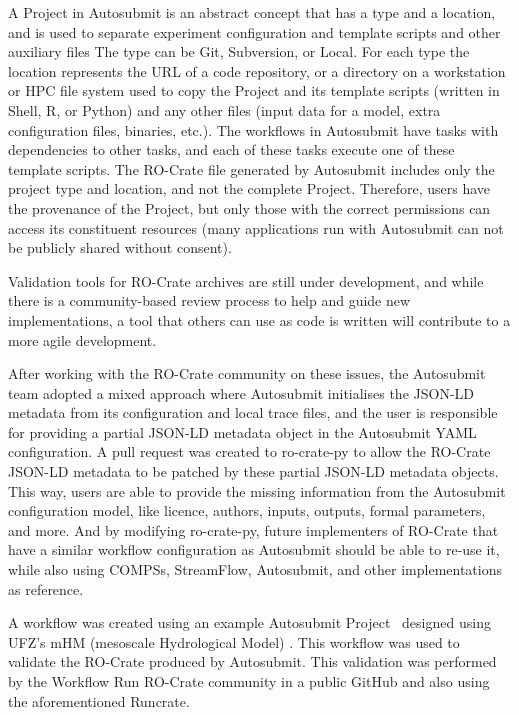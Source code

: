 A Project in Autosubmit is an abstract concept that has a type and a location, and is used to separate experiment configuration and template scripts and other auxiliary files
The type can be Git, Subversion, or Local.
For each type the location represents the URL of a code repository, or a directory on a workstation or HPC file system used to copy the Project and its template scripts (written in Shell, R, or Python) and any other files (input data for a model, extra configuration files, binaries, etc.).
The workflows in Autosubmit have tasks with dependencies to other tasks, and each of these tasks execute one of these template scripts.
The RO-Crate file generated by Autosubmit includes only the project type and location, and not the complete Project.
Therefore, users have the provenance of the Project, but only those with the correct permissions can access its constituent resources (many applications run with Autosubmit can not be publicly shared without consent).

Validation tools for RO-Crate archives are still under development, and while there is a community-based review process to help and guide new implementations, a tool that others can use as code is written will contribute to a more agile development.

After working with the RO-Crate community on these issues, the Autosubmit team adopted a mixed approach where Autosubmit initialises the JSON-LD metadata from its configuration and local trace files, and the user is responsible for providing a partial JSON-LD metadata object in the Autosubmit YAML configuration.
A pull request was created to ro-crate-py to allow the RO-Crate JSON-LD metadata to be patched by these partial JSON-LD metadata objects.
This way, users are able to provide the missing information from the Autosubmit configuration model, like licence, authors, inputs, outputs, formal parameters, and more.
And by modifying ro-crate-py, future implementers of RO-Crate that have a similar workflow configuration as Autosubmit should be able to re-use it, while also using COMPSs, StreamFlow, Autosubmit, and other implementations as reference.

A workflow was created using an example Autosubmit Project~\cite{Kinoshita 2023} designed using UFZ's mHM (mesoscale Hydrological Model)
\cite{Samaniego 2010,Kumar 2013}. This workflow was used to validate the RO-Crate produced by Autosubmit.
This validation was performed by the Workflow Run RO-Crate community in a public GitHub  and also using the aforementioned Runcrate.


